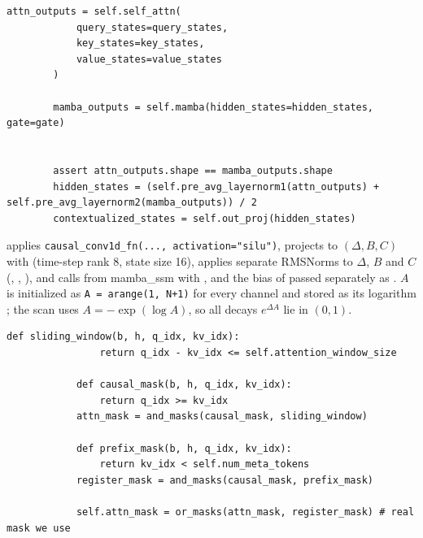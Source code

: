 \begin{lstlisting}[caption={Excerpt from \texttt{repos/\allowbreak NVlabs\_\_hymba/\allowbreak barebones\_hymba/\allowbreak barebones\_hymba\_block.py} (end of \texttt{HymbaBlock.forward}).},label={lst:c12-hymba-fuse}]
        attn_outputs = self.self_attn(
            query_states=query_states,
            key_states=key_states,
            value_states=value_states
        )

        mamba_outputs = self.mamba(hidden_states=hidden_states, gate=gate)


        assert attn_outputs.shape == mamba_outputs.shape
        hidden_states = (self.pre_avg_layernorm1(attn_outputs) + self.pre_avg_layernorm2(mamba_outputs)) / 2
        contextualized_states = self.out_proj(hidden_states)
\end{lstlisting}

\begin{implnote}[title={In the code: the SSM branch}]
 applies \texttt{causal\_conv1d\_fn(..., activation="silu")}, projects to
$(\Delta,B,C)$ with  (time-step rank 8, state size 16), applies separate RMSNorms to
$\Delta$, $B$ and $C$ (, , ), and calls
 from \textsf{mamba\_ssm} with , 
and the bias of  passed separately as . $A$ is initialized as
\texttt{A = arange(1, N+1)} for every channel and stored as its logarithm ; the
scan uses $A=-\exp(\log A)$, so all decays $e^{\Delta A}$ lie in $(0,1)$.
\end{implnote}

\begin{lstlisting}[caption={Excerpt from \texttt{repos/\allowbreak NVlabs\_\_hymba/\allowbreak barebones\_hymba/\allowbreak barebones\_hymba\_block.py} (\texttt{AttentionBranch.\_\_init\_\_}, mask construction).},label={lst:c12-hymba-mask}]
            def sliding_window(b, h, q_idx, kv_idx):
                return q_idx - kv_idx <= self.attention_window_size

            def causal_mask(b, h, q_idx, kv_idx):
                return q_idx >= kv_idx
            attn_mask = and_masks(causal_mask, sliding_window)
       
            def prefix_mask(b, h, q_idx, kv_idx):
                return kv_idx < self.num_meta_tokens
            register_mask = and_masks(causal_mask, prefix_mask)

            self.attn_mask = or_masks(attn_mask, register_mask) # real mask we use 
\end{lstlisting}

